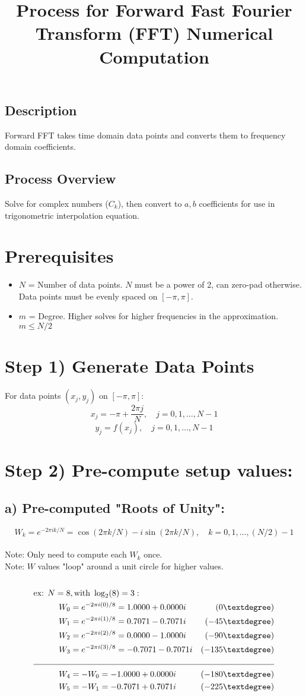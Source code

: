 \documentclass[12pt]{article}
\title{Process for Forward Fast Fourier Transform (FFT) Numerical Computation}
\author{}
\date{}
\begin{document}
\maketitle
\subsection*{Description}
Forward FFT takes time domain data points and converts them to frequency domain coefficients.

\subsection*{Process Overview}
Solve for complex numbers ($C_k$), then convert to $a,b$ coefficients for use in trigonometric interpolation equation. 

\section*{Prerequisites}
\begin{itemize}
    \item $N$ = Number of data points. $N$ must be a power of 2, can zero-pad otherwise. Data points must be evenly spaced on $[-\pi,\pi]$.
    \item $m$ = Degree. Higher solves for higher frequencies in the approximation. $m \leq N/2$
\end{itemize}

\section*{Step 1) Generate Data Points}
For data points $(x_j,y_j)$ on $[-\pi,\pi]$:
\[x_j = -\pi + \frac{2\pi j}{N}, \quad j=0,1,\ldots,N-1\]
\[y_j = f(x_j), \quad j=0,1,\ldots,N-1\]

\section*{Step 2) Pre-compute setup values:}
\subsection*{a) Pre-computed "Roots of Unity":}
\[W_k = e^{-2\pi ik/N} = \cos(2\pi k/N) - i\sin(2\pi k/N), \quad k=0,1,\ldots,(N/2)-1\]
\\
Note: Only need to compute each $W_k$ once.\\
Note: $W$ values "loop" around a unit circle for higher values.\\
\\
\begin{align*}
\text{ex: } N=8&, \text{with } \log_2(8)= 3: \\
W_0 &= e^{-2\pi i(0)/8} = 1.0000+0.0000i &(0°)\\
W_1 &= e^{-2\pi i(1)/8} = 0.7071-0.7071i &(-45°)\\
W_2 &= e^{-2\pi i(2)/8} = 0.0000-1.0000i &(-90°)\\
W_3 &= e^{-2\pi i(3)/8} = -0.7071-0.7071i &(-135°)\\ 
\cline{1-3}
W_4 &= -W_0 = -1.0000+0.0000i &(-180°)\\
W_5 &= -W_1 = -0.7071+0.7071i &(-225°)
\end{align*}
\end{document}
